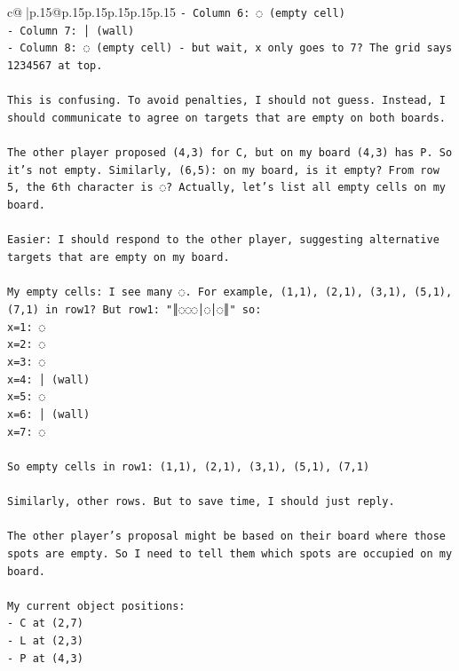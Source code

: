 \documentclass{article}
\begin{document}
{\begin{supertabular}{c@{$\;$}|p{.15\linewidth}@{}p{.15\linewidth}p{.15\linewidth}p{.15\linewidth}p{.15\linewidth}p{.15\linewidth}}
{{{\texttt{{-} Column 6: ◌ (empty cell)} \\
\texttt{{-} Column 7: │ (wall)} \\
\texttt{{-} Column 8: ◌ (empty cell) {-} but wait, x only goes to 7? The grid says 1234567 at top.} \\
\\ 
\texttt{This is confusing. To avoid penalties, I should not guess. Instead, I should communicate to agree on targets that are empty on both boards.} \\
\\ 
\texttt{The other player proposed (4,3) for C, but on my board (4,3) has P. So it's not empty. Similarly, (6,5): on my board, is it empty? From row 5, the 6th character is ◌? Actually, let's list all empty cells on my board.} \\
\\ 
\texttt{Easier: I should respond to the other player, suggesting alternative targets that are empty on my board.} \\
\\ 
\texttt{My empty cells: I see many ◌. For example, (1,1), (2,1), (3,1), (5,1), (7,1) in row1? But row1: "║◌◌◌│◌│◌║" so:} \\
\texttt{x=1: ◌} \\
\texttt{x=2: ◌} \\
\texttt{x=3: ◌} \\
\texttt{x=4: │ (wall)} \\
\texttt{x=5: ◌} \\
\texttt{x=6: │ (wall)} \\
\texttt{x=7: ◌} \\
\\ 
\texttt{So empty cells in row1: (1,1), (2,1), (3,1), (5,1), (7,1)} \\
\\ 
\texttt{Similarly, other rows. But to save time, I should just reply.} \\
\\ 
\texttt{The other player's proposal might be based on their board where those spots are empty. So I need to tell them which spots are occupied on my board.} \\
\\ 
\texttt{My current object positions:} \\
\texttt{{-} C at (2,7)} \\
\texttt{{-} L at (2,3)} \\
\texttt{{-} P at (4,3)} \\
\\ 
}}}
\end{supertabular}}
\end{document}

